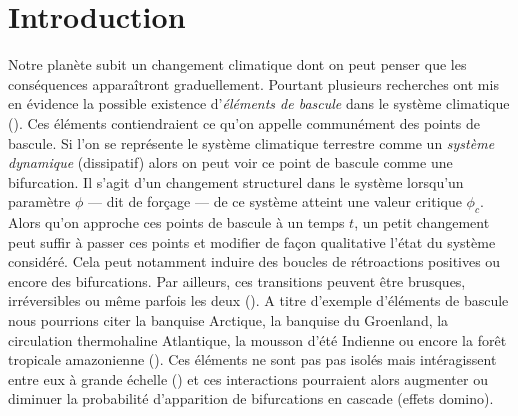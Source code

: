\section{Introduction}

Notre planète subit un changement climatique dont on peut penser que les conséquences apparaîtront graduellement. Pourtant plusieurs recherches ont mis en évidence la possible existence d'\emph{éléments de bascule} dans le système climatique (\cite{lenton_tipping_2008}). Ces éléments contiendraient ce qu'on appelle communément des points de bascule. Si l'on se représente le système climatique terrestre comme un \emph{système dynamique} (dissipatif) alors on peut voir ce point de bascule comme une bifurcation. Il s'agit d'un changement structurel dans le système lorsqu'un paramètre $\phi$ --- dit de forçage --- de ce système atteint une valeur critique $\phi_c$. Alors qu'on approche ces points de bascule à un temps $t$, un petit changement peut suffir à passer ces points et modifier de façon qualitative l'état du système considéré. Cela peut notamment induire des boucles de rétroactions positives ou encore des bifurcations. Par ailleurs, ces transitions peuvent être brusques, irréversibles ou même parfois les deux (\cite{Lenton_2012}). A titre d'exemple d'éléments de bascule nous pourrions citer la banquise Arctique, la banquise du Groenland, la circulation thermohaline Atlantique, la mousson d'été Indienne ou encore la forêt tropicale amazonienne (\cite{lenton_tipping_2008, thompson_predicting_2011}). Ces éléments ne sont pas pas isolés mais intéragissent entre eux à grande échelle (\cite{lenton_climate_2019_too_risky}) et ces interactions pourraient alors augmenter ou diminuer la probabilité d'apparition de bifurcations en cascade (effets domino).

